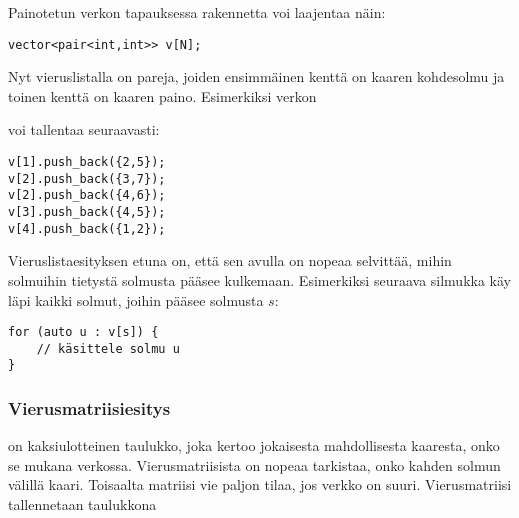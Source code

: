 Painotetun verkon tapauksessa rakennetta voi laajentaa näin:

\begin{lstlisting}
vector<pair<int,int>> v[N];
\end{lstlisting}

Nyt vieruslistalla on pareja, joiden ensimmäinen kenttä on
kaaren kohdesolmu ja toinen kenttä on kaaren paino.
Esimerkiksi verkon

\begin{center}
\end{center}
voi tallentaa seuraavasti:
\begin{lstlisting}
v[1].push_back({2,5});
v[2].push_back({3,7});
v[2].push_back({4,6});
v[3].push_back({4,5});
v[4].push_back({1,2});
\end{lstlisting}

Vieruslistaesityksen etuna on, että sen avulla on nopeaa selvittää,
mihin solmuihin tietystä solmusta pääsee kulkemaan.
Esimerkiksi seuraava silmukka käy läpi kaikki solmut,
joihin pääsee solmusta $s$:

\begin{lstlisting}
for (auto u : v[s]) {
    // käsittele solmu u
}
\end{lstlisting}

\subsubsection{Vierusmatriisiesitys}


 on kaksiulotteinen taulukko,
joka kertoo jokaisesta mahdollisesta kaaresta,
onko se mukana verkossa.
Vierusmatriisista on nopeaa tarkistaa,
onko kahden solmun välillä kaari.
Toisaalta matriisi vie paljon tilaa,
jos verkko on suuri.
Vierusmatriisi tallennetaan taulukkona

